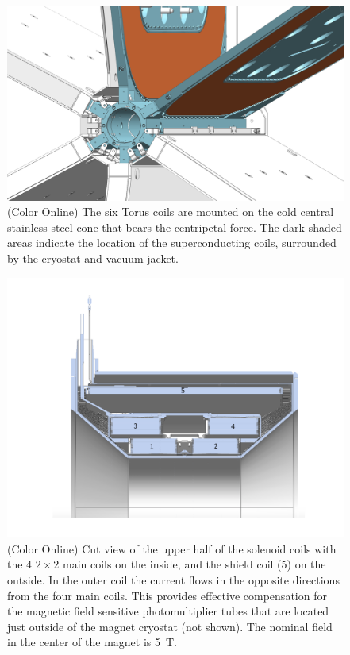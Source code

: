 \documentclass[final,3p,twocolumn]{elsarticle}
\begin{document}
\begin{figure}[htbp!]
\centerline{\includegraphics[width=1.00\columnwidth]{torus-hub-2.png}}
\caption{(Color Online) The six Torus coils are mounted on the cold central stainless steel cone that bears the centripetal force. The
dark-shaded areas indicate the location of the superconducting coils, surrounded by the cryostat and vacuum jacket.}
\label{coil-mount}
\end{figure}

\begin{figure}[htbp!]
\centerline{\includegraphics[width=1.3\columnwidth]{Solenoid.pdf}}
\caption{(Color Online) Cut view of the upper half of the solenoid coils with the 4 $2 \times 2$ main coils on the inside, and the shield
coil (5) on the outside. In the outer coil the current flows in the opposite directions from the four main coils. This
provides effective compensation for the magnetic field sensitive photomultiplier tubes that are located just outside
of the magnet cryostat (not shown). The nominal field in the center of the magnet is 5~T.}
\label{solenoid-coils}
\end{figure}
\end{document}
